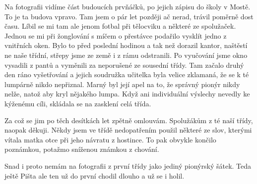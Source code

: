 
Na fotografii vidíme část budoucích prvňáčků, po jejich zápisu do
školy v Mostě. To je ta budova vpravo. Tam jsem o pár let později ač
nerad, trávil poměrně dost času. Líbil se mi tam ale jenom fotbal při
tělocviku a některé ze spolužaček. Jednou se mi při žonglování s míčem
o přestávce podařilo vysklít jedno z vnitřních oken. Bylo to před
poslední hodinou a tak než dorazil kantor, naštěstí ne naše třídní,
střepy jsme ze země i z rámu odstranili. Po vyučování jsme okno
vysadili z pantů a vyměnili za neporušené ze sousední třídy. Tam
začalo druhý den ráno vyšetřování a jejich soudružka učitelka byla
velice zklamaná, že se k té lumpárně nikdo nepřiznal. Marný byl její
apel na to, že správný pionýr nikdy nelže, natož aby kryl nějakého
lumpa. Když ani individuální výslechy nevedly ke kýženému cíli,
skládala se na zasklení celá třída.

Za což se jim po těch desítkách let zpětně omlouvám. Spolužákům z té
naší třídy, naopak děkuji. Někdy jsem ve třídě nedopatřením použil
některé ze slov, kterými vítala matka otce při jeho návratu z
hostince. To pak obvykle končilo poznámkou, potažmo sníženou známkou z
chování.

Snad i proto nemám na fotografii z první třídy jako jediný pionýrský
šátek. Teda ještě Pišta ale ten už do první chodil dlouho a už se i
holil.
